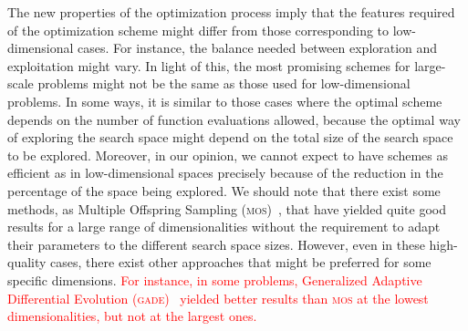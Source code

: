 \documentclass[review,3p]{elsarticle}
\begin{document}
The new properties of the optimization process imply that the features required of the optimization scheme
might differ from those corresponding to low-dimensional cases.
%
For instance, the balance needed between exploration and exploitation might vary.
%
In light of this, the most promising schemes for large-scale problems might not be the same
as those used for low-dimensional problems.
%
In some ways, it is similar to those cases where the optimal scheme depends on the number of function evaluations allowed,
because the optimal way of exploring the search space might depend on the total size of the search space to be explored.
%
Moreover, in our opinion, we cannot expect to have schemes as efficient as in low-dimensional spaces precisely because of the
reduction in the percentage of the space being explored.
%
 We should note that there exist some methods, as Multiple Offspring Sampling (\textsc{mos})~\cite{LaTorre:11}, that have yielded quite good results for a large range of dimensionalities without
the requirement to adapt their parameters to the different search space sizes.
%
However, even in these high-quality cases, there exist other approaches that might be preferred for some specific dimensions.
%
\textcolor{red}{
For instance, in some problems, Generalized Adaptive Differential Evolution (\textsc{gade})~\cite{Yang:11} yielded better results than \textsc{mos} at the lowest dimensionalities,
but not at the largest ones.
}
%
%
\end{document}
